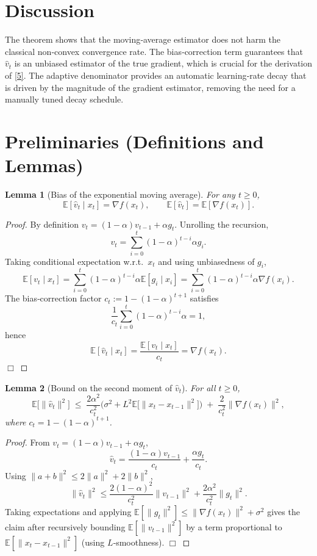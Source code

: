 \documentclass{article}
\newtheorem{lemma}{Lemma}
\newcommand{\EE}{\mathbb{E}}
\newcommand{\grad}{\nabla}
\begin{document}
\section*{Discussion}
The theorem shows that the moving‑average estimator does not harm the classical non‑convex convergence rate. The bias‑correction term guarantees that $\hat v_t$ is an unbiased estimator of the true gradient, which is crucial for the derivation of \eqref{5}. The adaptive denominator provides an automatic learning‑rate decay that is driven by the magnitude of the gradient estimator, removing the need for a manually tuned decay schedule.

\newpage
\section*{Preliminaries (Definitions and Lemmas)}
\begin{lemma}[Bias of the exponential moving average]\label{lem:bias}
For any $t\ge0$,
\[
\EE[\hat v_t\mid x_t]=\grad f(x_t),\qquad
\EE[\hat v_t]=\EE[\grad f(x_t)] .
\]
\end{lemma}
\begin{proof}
By definition $v_t=(1-\alpha)v_{t-1}+\alpha g_t$.  Unrolling the recursion,
\[
v_t=\sum_{i=0}^{t}(1-\alpha)^{t-i}\alpha g_i .
\]
Taking conditional expectation w.r.t.\ $x_t$ and using unbiasedness of $g_i$,
\[
\EE[v_t\mid x_t]=\sum_{i=0}^{t}(1-\alpha)^{t-i}\alpha \EE[g_i\mid x_i]
   =\sum_{i=0}^{t}(1-\alpha)^{t-i}\alpha \grad f(x_i).
\]
The bias‑correction factor $c_t:=1-(1-\alpha)^{t+1}$ satisfies
\[
\frac{1}{c_t}\sum_{i=0}^{t}(1-\alpha)^{t-i}\alpha =1,
\]
hence
\[
\EE[\hat v_t\mid x_t]=\frac{\EE[v_t\mid x_t]}{c_t}=\grad f(x_t).
\] 
\hfill\(\Box\)
\end{proof}

\begin{lemma}[Bound on the second moment of $\hat v_t$]\label{lem:second}
For all $t\ge0$,
\[
\EE\!\big[\|\hat v_t\|^{2}\big]\;\le\;
\frac{2\alpha^{2}}{c_t^{2}}\Big(\sigma^{2}+L^{2}\EE\!\big[\|x_t-x_{t-1}\|^{2}\big]\Big)
\;+\;
\frac{2}{c_t^{2}}\Big\|\grad f(x_t)\Big\|^{2},
\]
where $c_t=1-(1-\alpha)^{t+1}$.
\end{lemma}
\begin{proof}
From $v_t=(1-\alpha)v_{t-1}+\alpha g_t$,
\[
\hat v_t=\frac{(1-\alpha)v_{t-1}}{c_t}+\frac{\alpha g_t}{c_t}.
\]
Using $\|a+b\|^{2}\le2\|a\|^{2}+2\|b\|^{2}$,
\[
\|\hat v_t\|^{2}\le\frac{2(1-\alpha)^{2}}{c_t^{2}}\|v_{t-1}\|^{2}
               +\frac{2\alpha^{2}}{c_t^{2}}\|g_t\|^{2}.
\]
Taking expectations and applying $\EE[\|g_t\|^{2}]\le\|\grad f(x_t)\|^{2}+\sigma^{2}$ gives the claim after recursively bounding $\EE[\|v_{t-1}\|^{2}]$ by a term proportional to $\EE[\|x_t-x_{t-1}\|^{2}]$ (using $L$‑smoothness).  
\hfill\(\Box\)
\end{proof}
\end{document}
